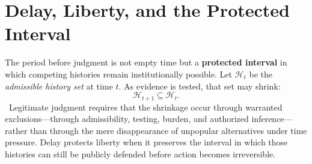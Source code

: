 
\chapter{Delay, Liberty, and the Protected Interval}
\label{ch:ch046}

The period before judgment is not empty time but a \textbf{protected interval} in which competing histories remain institutionally possible. Let \(\mathcal H_t\) be the \emph{admissible history set} at time \(t\). As evidence is tested, that set may shrink:
\[
\mathcal H_{t+1}\subseteq\mathcal H_t.
\]
\Definition\ Legitimate judgment requires that the shrinkage occur through warranted exclusions---through admissibility, testing, burden, and authorized inference---rather than through the mere disappearance of unpopular alternatives under time pressure.
Delay protects liberty when it preserves the interval in which those histories can still be publicly defended before action becomes irreversible.
